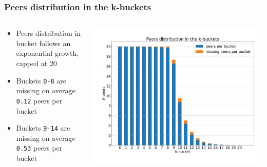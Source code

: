 \documentclass{pl-slide}
\begin{document}
\begin{frame}
\frametitle{Peers distribution in the k-buckets}

\begin{columns}[onlytextwidth]
\begin{column}{0.38\textwidth}
   	\begin{itemize}
   		\item Peers distribution in bucket follows an exponential growth, capped at 20
   		\item Buckets \texttt{0-8} are missing on average \texttt{0.12} peers per bucket
   		\item Buckets \texttt{9-14} are missing on average \texttt{0.53} peers per bucket
   	\end{itemize}
\end{column}
\begin{column}{0.58\textwidth}
    \begin{center}
		\includegraphics[width=\textwidth]{plots/peers-distribution-including-missing.png}
    \end{center}
\end{column}
\end{columns}
\end{frame}
\end{document}
